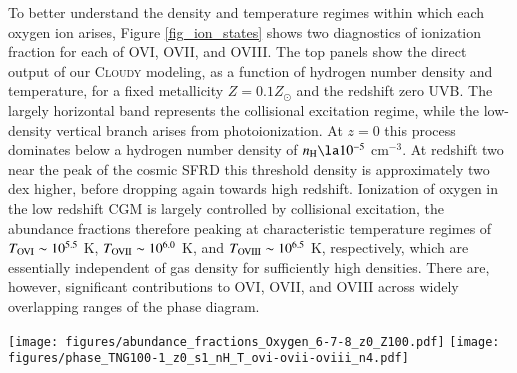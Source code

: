 \documentclass[useAMS,usenatbib]{mnras}
\newcommand{\ovi}{OVI\xspace}
\newcommand{\ovii}{OVII\xspace}
\newcommand{\oviii}{OVIII\xspace}
\begin{document}
To better understand the density and temperature regimes within which each oxygen ion arises, Figure \ref{fig_ion_states} shows two diagnostics of ionization fraction for each of \ovi, \ovii, and \oviii. The top panels show the direct output of our \textsc{Cloudy} modeling, as a function of hydrogen number density and temperature, for a fixed metallicity $Z = 0.1 Z_\odot$ and the redshift zero UVB. The largely horizontal band represents the collisional excitation regime, while the low-density vertical branch arises from photoionization. At $z=0$ this process dominates below a hydrogen number density of $n_{\rm H} \la 10^{-5}$ cm$^{-3}$. At redshift two near the peak of the cosmic SFRD this threshold density is approximately two dex higher, before dropping again towards high redshift. Ionization of oxygen in the low redshift CGM is largely controlled by collisional excitation, the abundance fractions therefore peaking at characteristic temperature regimes of $T_{\rm OVI} \sim 10^{5.5}$ K, $T_{\rm OVII} \sim 10^{6.0}$ K, and $T_{\rm OVIII} \sim 10^{6.5}$ K, respectively, which are essentially independent of gas density for sufficiently high densities. There are, however, significant contributions to \ovi, \ovii, and \oviii across widely overlapping ranges of the phase diagram.

\begin{figure*}
\centering
\texttt{[image: figures/abundance\_fractions\_Oxygen\_6-7-8\_z0\_Z100.pdf]}
\texttt{[image: figures/phase\_TNG100-1\_z0\_s1\_nH\_T\_ovi-ovii-oviii\_n4.pdf]}
\caption{ \textbf{Top panels.} Ionization fractions of \ovi, \ovii, and \oviii as a function of density and temperature. The output of the \textsc{Cloudy} modeling given our assumed background radiation field (at $z=0$), and for a fixed metallicity of $Z = 0.1 Z_\odot$. Whereas the horizontal bands represent the regime of predominantly collisional excitation, the largely vertical bands at low hydrogen number densities arise from photoionization; simulation independent. \textbf{Bottom panels.} Phase diagrams in density temperature space for the TNG100 simulation at $z=0$. From left to right, these are weighted by the total per-pixel ion mass of \ovi, \ovii, and \oviii, respectively. The normalized colormap indicates the relative ion mass fraction -- i.e., dark purple values at -4.0 have 10,000 times less ion mass per pixel than peak pixels in yellow. The three black contours enclose relative mass log fractions of $\{-1.0, -2.0, -3.0\}$, from innermost to outermost.
 \label{fig_ion_states}}
\end{figure*}
\end{document}

